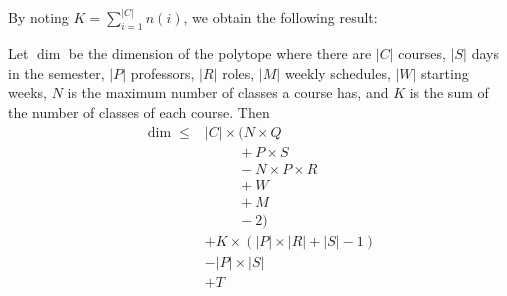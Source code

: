By noting $K = \sum_{i=1}^{|C|} n(i)$, we obtain the following result:

\begin{thm}
Let $\dim$ be the dimension of the polytope where there are $|C|$ courses, $|S|$ days in the semester, $|P|$ professors, $|R|$ roles, $|M|$ weekly schedules, $|W|$ starting weeks, $N$ is the maximum number of classes a course has, and $K$ is the sum of the number of classes of each course. Then
\begin{align*}
  \dim \le &|C| \times (N \times Q\\
                      &\hspace{1cm}+ P \times S\\
                      &\hspace{1cm}- N \times P \times R\\
                      &\hspace{1cm}+ W\\
                      &\hspace{1cm}+ M\\
                      &\hspace{1cm}- 2)\\
           &+ K \times (|P| \times |R| + |S| - 1)\\
           &- |P| \times |S|\\
           &+ T
\end{align*}
\end{thm}
